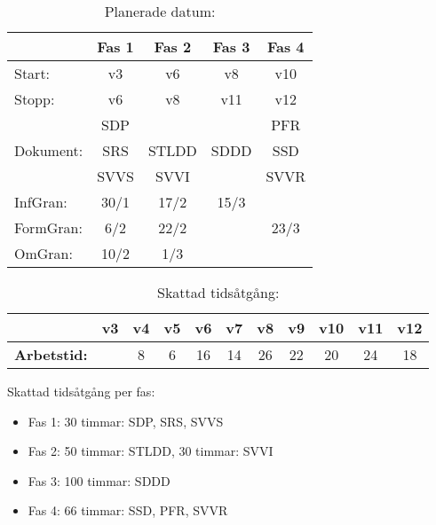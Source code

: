 \documentclass[paper=a4, fontsize=11pt,twoside]{article}
\begin{document}
\begin{table}[H]
\centering
\caption{Planerade datum:}
\begin{tabular}{| l | c | c | c | c |} %
\hline
 & Fas 1 & Fas 2 & Fas 3 & Fas 4\\
\hline
Start: & v3 & v6 & v8 & v10 \\
\hline
Stopp: & v6 & v8 & v11 & v12 \\
\hline
 				& SDP & & & PFR \\
Dokument: & SRS & STLDD & SDDD & SSD \\
 				& SVVS & SVVI & & SVVR \\
\hline
InfGran: & 30/1 & 17/2 & 15/3 & 	 \\
\hline
FormGran: & 6/2 & 22/2 &	 & 23/3 \\
\hline
OmGran: & 10/2 & 1/3 &		 & \\
\hline
\end{tabular}
\end{table}

\begin{table}[H]
\centering
\caption{Skattad tidsåtgång:}
\vspace{0.2cm}
\begin{tabular}{| l | c | c | c | c | c | c | c | c | c | c |}
\hline
 & \textbf{v3} & \textbf{v4} & \textbf{v5} & \textbf{v6} & \textbf{v7} & \textbf{v8} & \textbf{v9} & \textbf{v10} & \textbf{v11} & \textbf{v12}\\
\hline
\textbf{Arbetstid:}  &  & 8 & 6 & 16 & 14 & 26 & 22 & 20 & 24 & 18 \\
\hline
\end{tabular}
\end{table}
Skattad tidsåtgång per fas:
\begin{itemize}
\item Fas 1: 30 timmar: SDP, SRS, SVVS
\item Fas 2: 50 timmar: STLDD, 30 timmar: SVVI
\item Fas 3: 100 timmar: SDDD
\item Fas 4: 66 timmar: SSD, PFR, SVVR
\end{itemize}%
\end{document}

